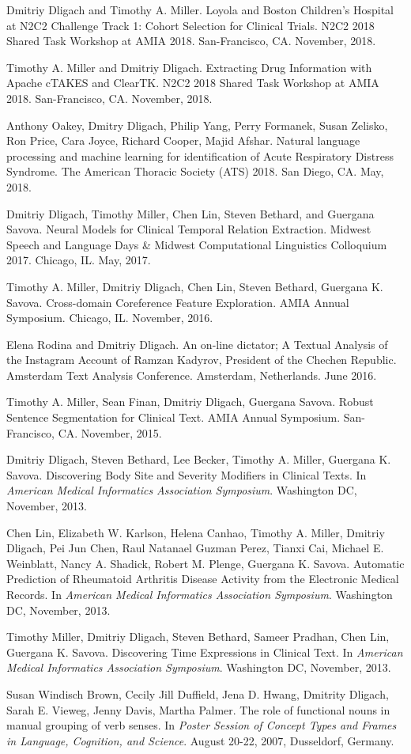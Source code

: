 \documentclass[letterpaper]{article}
\renewenvironment{itemize}{
  \begin{list}{}{
    \setlength{\leftmargin}{1.5em}
  }
}{
  \end{list}
}
\begin{document}
\begin{itemize}
\item Dmitriy Dligach and Timothy A. Miller. Loyola and Boston Children's Hospital at N2C2 Challenge Track 1: Cohort Selection for Clinical Trials. N2C2 2018 Shared Task Workshop at AMIA 2018. San-Francisco, CA. November, 2018.
\item Timothy A. Miller and Dmitriy Dligach. Extracting Drug Information with Apache cTAKES and ClearTK. N2C2 2018 Shared Task Workshop at AMIA 2018. San-Francisco, CA. November, 2018.
\item Anthony Oakey, Dmitry Dligach, Philip Yang, Perry Formanek, Susan Zelisko, Ron Price, Cara Joyce, Richard Cooper, Majid Afshar. Natural language processing and machine learning for identification of Acute Respiratory Distress Syndrome. The American Thoracic Society (ATS) 2018. San Diego, CA. May, 2018.
\item Dmitriy Dligach, Timothy Miller, Chen Lin, Steven Bethard, and Guergana Savova. Neural Models for Clinical Temporal Relation Extraction. Midwest Speech and Language Days \& Midwest Computational Linguistics Colloquium 2017. Chicago, IL. May, 2017.
\item Timothy A. Miller, Dmitriy Dligach, Chen Lin, Steven Bethard, Guergana K. Savova. Cross-domain Coreference Feature Exploration. AMIA Annual Symposium. Chicago, IL. November, 2016.
\item Elena Rodina and Dmitriy Dligach. An on-line dictator; A Textual Analysis of the Instagram Account of Ramzan Kadyrov, President of the Chechen Republic. Amsterdam Text Analysis Conference. Amsterdam, Netherlands. June 2016.
\item Timothy A. Miller, Sean Finan, Dmitriy Dligach, Guergana Savova. Robust Sentence Segmentation for Clinical Text. AMIA Annual Symposium. San-Francisco, CA. November, 2015.
\item Dmitriy Dligach, Steven Bethard, Lee Becker, Timothy A. Miller, Guergana K. Savova. Discovering Body Site and Severity Modifiers in Clinical Texts. In \emph{American Medical Informatics Association Symposium}. Washington DC, November, 2013.
\item Chen Lin, Elizabeth W. Karlson, Helena Canhao, Timothy A. Miller, Dmitriy Dligach, Pei Jun Chen, Raul Natanael Guzman Perez, Tianxi Cai, Michael E. Weinblatt, Nancy A. Shadick, Robert M. Plenge, Guergana K. Savova. Automatic Prediction of Rheumatoid Arthritis Disease Activity from the Electronic Medical Records. In \emph{American Medical Informatics Association Symposium}. Washington DC, November, 2013.
\item Timothy Miller, Dmitriy Dligach, Steven Bethard, Sameer Pradhan, Chen Lin, Guergana K. Savova. Discovering Time Expressions in Clinical Text. In \emph{American Medical Informatics Association Symposium}. Washington DC, November, 2013.
\item Susan Windisch Brown, Cecily Jill Duffield, Jena D. Hwang, Dmitrity Dligach, Sarah E. Vieweg, Jenny Davis, Martha Palmer. The role of functional nouns in manual grouping of verb senses. In \emph {Poster Session of Concept Types and Frames in Language, Cognition, and Science}. August 20-22, 2007, Dusseldorf, Germany.
\end{itemize}
\end{document}
